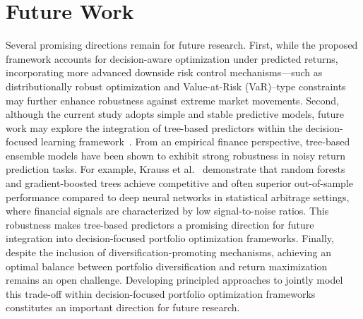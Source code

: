 \documentclass[review]{elsarticle}
\begin{document}
\section{Future Work}
Several promising directions remain for future research. First, while the proposed framework accounts for decision-aware optimization under predicted returns, incorporating more advanced downside risk control mechanisms—such as distributionally robust optimization and Value-at-Risk (VaR)–type constraints may further enhance robustness against extreme market movements.  Second, although the current study adopts simple and stable predictive models, future work may explore the integration of tree-based predictors within the decision-focused learning framework~\cite{SPoTs2020}. From an empirical finance perspective, tree-based ensemble models have been shown to exhibit strong robustness in noisy return prediction tasks. For example, Krauss et al.~\cite{KRAUSS2017Review1} demonstrate that random forests and gradient-boosted trees achieve competitive and often superior out-of-sample performance compared to deep neural networks in statistical arbitrage settings, where financial signals are characterized by low signal-to-noise ratios. This robustness makes tree-based predictors a promising direction for future integration into decision-focused portfolio optimization frameworks.  Finally, despite the inclusion of diversification-promoting mechanisms, achieving an optimal balance between portfolio diversification and return maximization remains an open challenge. Developing principled approaches to jointly model this trade-off within decision-focused portfolio optimization frameworks constitutes an important direction for future research.


\newpage


\end{document}
